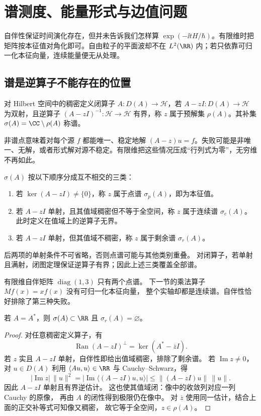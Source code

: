 \chapter{谱测度、能量形式与边值问题}
\label{chap:math-spectrum}

自伴性保证时间演化存在，但并未告诉我们怎样算 \(\exp(-\ii tH/\hbar)\)。有限维时把矩阵按本征值对角化即可。自由粒子的平面波却不在 \(L^2(\RR)\) 内；若只依靠可归一化本征向量，连续能量便无从处理。

\section{谱是逆算子不能存在的位置}

\begin{definition}[预解集与谱]
对 Hilbert 空间中的稠密定义闭算子 \(A:D(A)\to\mathcal H\)，若 \(A-zI:D(A)\to\mathcal H\) 为双射，且逆算子 \((A-zI)^{-1}:\mathcal H\to\mathcal H\) 有界，称 \(z\) 属于预解集 \(\rho(A)\)。其补集 \(\sigma(A)=\CC\setminus\rho(A)\) 称谱。
\end{definition}

非谱点意味着对每个源 \(f\) 都能唯一、稳定地解 \((A-z)u=f\)。失败可能是非唯一、无解，或者形式解对源不稳定。有限维把这些情况压成“行列式为零”，无穷维不再如此。

\begin{definition}[点谱、连续谱与剩余谱]
\(\sigma(A)\) 按以下顺序分成互不相交的三类：
\begin{enumerate}
\item 若 \(\ker(A-zI)\ne\{0\}\)，称 \(z\) 属于点谱 \(\sigma_p(A)\)，即为本征值。
\item 若 \(A-zI\) 单射，且其值域稠密但不等于全空间，称 \(z\) 属于连续谱 \(\sigma_c(A)\)。此时定义在值域上的逆算子无界。
\item 若 \(A-zI\) 单射，但其值域不稠密，称 \(z\) 属于剩余谱 \(\sigma_r(A)\)。
\end{enumerate}
后两项的单射条件不可省略，否则点谱可能与其他类别重叠。
对闭算子，若单射且满射，闭图定理保证逆算子有界；因此上述三类覆盖全部谱。
\end{definition}

有限维自伴矩阵 $\operatorname{diag}(1,3)$ 只有两个点谱。
下一节的乘法算子 $Mf(x)=xf(x)$ 没有可归一化本征向量，
整个实轴却都是连续谱。自伴性恰好排除了第三种失败。

\begin{proposition}[自伴算子的实谱与剩余谱]
若 $A=A^*$，则 $\sigma(A)\subset\RR$ 且 $\sigma_r(A)=\varnothing$。
\end{proposition}
\begin{proof}
对任意稠密定义算子，有
\[
\operatorname{Ran}(A-zI)^\perp=\ker(A^*-\overline zI).
\]
若 $z$ 实且 $A-zI$ 单射，自伴性即给出值域稠密，排除了剩余谱。
若 $\operatorname{Im}z\ne0$，对 $u\in D(A)$ 利用
$\langle Au,u\rangle\in\RR$ 与 Cauchy--Schwarz，得
\[
|\operatorname{Im}z|\,\|u\|^2
=|\operatorname{Im}\langle(A-zI)u,u\rangle|
\le\|(A-zI)u\|\,\|u\|.
\]
因此 $A-zI$ 单射且有界逆估计。
这也使其值域闭：像中的收敛列对应一列 Cauchy 的原像，
再由 $A$ 的闭性得到极限仍在像中。
对 $\overline z$ 使用同一估计，结合上面的正交补等式可知像又稠密，
故它等于全空间，$z\in\rho(A)$。
\end{proof}

